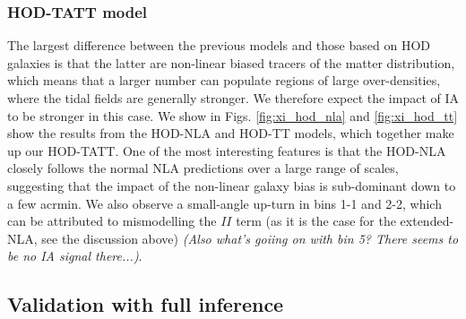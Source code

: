 \subsubsection*{HOD-TATT model}
\label{subsec:HOD}







The largest difference between the previous models and those based on HOD galaxies is that the latter are non-linear biased tracers of the matter distribution, which means that a larger number can populate regions of large over-densities, where the tidal fields are generally stronger. We therefore expect the impact of IA to be stronger in this case. We show in Figs. \ref{fig:xi_hod_nla} and \ref{fig:xi_hod_tt} show the results from the HOD-NLA  and HOD-TT models, which together make up our HOD-TATT. One of the most interesting features is that the HOD-NLA closely follows the normal NLA predictions over a large range of scales, suggesting that the impact of the non-linear galaxy bias is sub-dominant down to a few acrmin. We also observe a small-angle up-turn in bins 1-1 and 2-2, which can be attributed to mismodelling the $II$ term (as it is the case for the extended-NLA, see the discussion above) {\it (Also what's goiing on with bin 5? There seems to be no IA signal there...)}. 



\subsection{Validation with full inference}
 \label{sec:inference}

 
 
 






 

